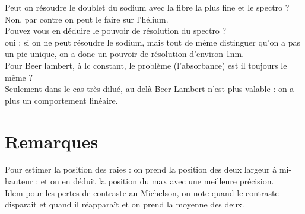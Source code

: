 \documentclass[12pt,prb,aps,epsf]{article}
\begin{document}
Peut on résoudre le doublet du sodium avec la fibre la plus fine et le spectro ?\\
Non, par contre on peut le faire sur l'hélium. \\

Pouvez vous en déduire le pouvoir de résolution du spectro ?\\
oui : si on ne peut résoudre le sodium, mais tout de même distinguer qu'on a pas un pic unique, on a donc un pouvoir de résolution d'environ 1nm.\\

Pour Beer lambert, à lc constant, le problème (l'absorbance) est il toujours le même ?\\
Seulement dans le cas très dilué, au delà Beer Lambert n'est plus valable : on a plus un comportement linéaire.

\section*{Remarques}
Pour estimer la position des raies : on prend la position des deux largeur à mi-hauteur : et on en déduit la position du max avec une meilleure précision.\\
Idem pour les pertes de contraste au Michelson, on note quand le contraste disparait et quand il réapparaît et on prend la moyenne des deux.\\
\end{document}

